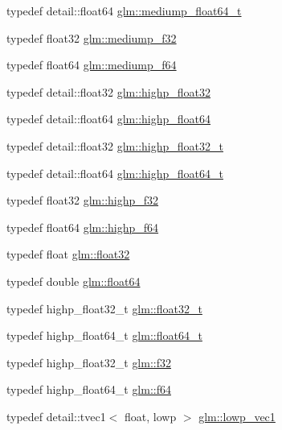 \begin{DoxyCompactItemize}
\item 
typedef detail\+::float64 \hyperlink{group__gtc__type__precision_ga97a0747b103eb5ef320a91888de52f51}{glm\+::mediump\+\_\+float64\+\_\+t}
\item 
typedef float32 \hyperlink{group__gtc__type__precision_ga3dbba6bd06a546d7a11d1c09c2f04b1a}{glm\+::mediump\+\_\+f32}
\item 
typedef float64 \hyperlink{group__gtc__type__precision_gabd273bd38ea5e013aeec9ffd2b2591fb}{glm\+::mediump\+\_\+f64}
\item 
typedef detail\+::float32 \hyperlink{group__gtc__type__precision_ga91af7513c1102410646f2c435ca29be5}{glm\+::highp\+\_\+float32}
\item 
typedef detail\+::float64 \hyperlink{group__gtc__type__precision_gab871a78c548d2fa53e1e8ec64a46eee7}{glm\+::highp\+\_\+float64}
\item 
typedef detail\+::float32 \hyperlink{group__gtc__type__precision_ga4e16a7818d09e2da3b81765999f23928}{glm\+::highp\+\_\+float32\+\_\+t}
\item 
typedef detail\+::float64 \hyperlink{group__gtc__type__precision_gae8b3b2ace5be2a61c6bf63f12643fa15}{glm\+::highp\+\_\+float64\+\_\+t}
\item 
typedef float32 \hyperlink{group__gtc__type__precision_ga48d80b6fd3a40b71b2e414493832d1ca}{glm\+::highp\+\_\+f32}
\item 
typedef float64 \hyperlink{group__gtc__type__precision_gab1306a5a8ae99fb2867b548b1546bbe0}{glm\+::highp\+\_\+f64}
\item 
typedef float \hyperlink{group__gtc__type__precision_ga814f2f65354b6588b067cc5c67a6b340}{glm\+::float32}
\item 
typedef double \hyperlink{group__gtc__type__precision_gab721f828b41f46b20cf4883b50733d3b}{glm\+::float64}
\item 
typedef highp\+\_\+float32\+\_\+t \hyperlink{group__gtc__type__precision_ga642737ae3e7c434b366f2191e6944bf2}{glm\+::float32\+\_\+t}
\item 
typedef highp\+\_\+float64\+\_\+t \hyperlink{group__gtc__type__precision_gade966a3eb25ebeb16dd53c40d3fdeb46}{glm\+::float64\+\_\+t}
\item 
typedef highp\+\_\+float32\+\_\+t \hyperlink{group__gtc__type__precision_ga0ec999b57f5330d9021256e96038df04}{glm\+::f32}
\item 
typedef highp\+\_\+float64\+\_\+t \hyperlink{group__gtc__type__precision_ga2bba392e555124b36cde6abba349bab3}{glm\+::f64}
\item 
typedef detail\+::tvec1$<$ float, lowp $>$ \hyperlink{group__gtc__type__precision_gae48c64f920be353ece773ff367f0161c}{glm\+::lowp\+\_\+vec1}

\end{DoxyCompactItemize}
